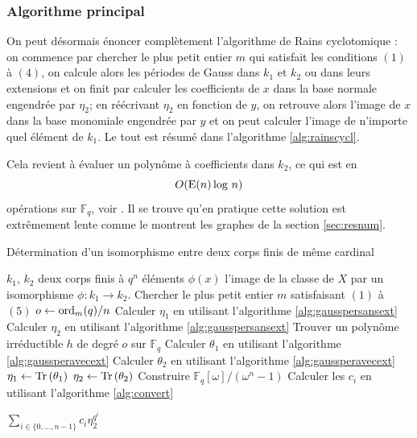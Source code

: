 \documentclass[a4paper]{article} %
\numberwithin{section}{part}
\numberwithin{equation}{section}
\newcommand\GF[1]{\mathbb{F}_{#1}}
\newcommand\Tr[1]{\textup{Tr}\left(#1\right)}
\newcommand\E[1]{\textup{E}(#1)}
\newcommand\ord[2]{\textup{ord}_{#1}(#2)}
\begin{document}
\subsubsection*{Algorithme principal}

On peut désormais énoncer complètement l'algorithme de Rains cyclotomique : on
commence par chercher le plus petit entier $m$ qui satisfait les conditions
$(1)$ à $(4)$, on calcule alors les périodes de Gauss dans $k_1$ et $k_2$ ou
dans leurs extensions et on finit par calculer les coefficients de $x$ dans la
base normale engendrée par $\eta_2$; en réécrivant $\eta_2$ en fonction de $y$,
on retrouve alors l'image de $x$ dans la base monomiale engendrée par $y$ et on
peut calculer l'image de n'importe quel élément de $k_1$. Le tout est résumé
dans l'algorithme \ref{alg:rainscycl}.
\begin{rem}
Cela revient à évaluer un polynôme à coefficients dans $k_2$, ce qui est en 
\begin{equation}
O(\E{n}\,\textup{log }n)
\end{equation}
opérations sur $\GF{q}$, voir \cite[Cor. 10.8]{GaGe}. Il se trouve qu'en
pratique cette solution est extrêmement lente comme le montrent les graphes
de la section \ref{sec:resnum}.
\end{rem}
\begin{algorithm}
\caption{Détermination d'un isomorphisme entre deux corps finis de même
cardinal}
\label{alg:rainscycl}
\begin{algorithmic}[1]
\REQUIRE $k_1$, $k_2$ deux corps finis à $q^n$ éléments
\ENSURE $\phi(x)$ l'image de la classe de $X$ par un isomorphisme $\phi : k_1
\to k_2$. 
\bigskip
\STATE Chercher le plus petit entier $m$ satisfaisant $(1)$ à $(5)$
\STATE $o \leftarrow \ord{m}{q}/n$
    \STATE Calculer $\eta_1$ en utilisant l'algorithme \ref{alg:gausspersansext}
    \STATE Calculer $\eta_2$ en utilisant l'algorithme \ref{alg:gausspersansext}
\ELSE
    \STATE Trouver un polynôme irréductible $h$ de degré $o$ sur $\GF{q}$
    \STATE Calculer $\theta_1$ en utilisant l'algorithme 
    \ref{alg:gaussperavecext}
    \STATE Calculer $\theta_2$ en utilisant l'algorithme 
    \ref{alg:gaussperavecext}
    \STATE $\eta_1 \leftarrow \Tr{\theta_1}$
    \STATE $\eta_2 \leftarrow \Tr{\theta_2}$
\ENDIF
\STATE Construire $\GF{q}[\omega]/(\omega^n - 1)$
\STATE Calculer les $c_i$ en utilisant l'algorithme \ref{alg:convert}

\RETURN $\sum_{i\in\lbrace{0,\dots,n-1}\rbrace}{c_i\eta_2^{q^i}}$

\end{algorithmic}
\end{algorithm}
\end{document}
